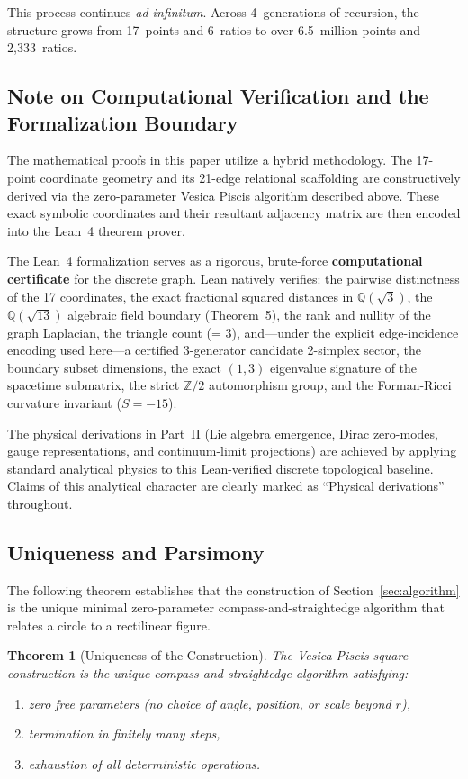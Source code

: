\documentclass[12pt, a4paper]{article}
\newtheorem{theorem}{Theorem}
\begin{document}
\noindent This process continues \emph{ad infinitum}. Across 4~generations of recursion, the structure grows from 17~points and 6~ratios to over 6.5~million points and 2{,}333~ratios.

\subsection{Note on Computational Verification and the Formalization Boundary}\label{sec:formalization}

The mathematical proofs in this paper utilize a hybrid methodology. The 17-point coordinate geometry and its 21-edge relational scaffolding are constructively derived via the zero-parameter Vesica Piscis algorithm described above. These exact symbolic coordinates and their resultant adjacency matrix are then encoded into the Lean~4 theorem prover.

The Lean~4 formalization serves as a rigorous, brute-force \textbf{computational certificate} for the discrete graph. Lean natively verifies: the pairwise distinctness of the 17 coordinates, the exact fractional squared distances in $\mathbb{Q}(\sqrt{3})$, the $\mathbb{Q}(\sqrt{13})$ algebraic field boundary (Theorem~5), the rank and nullity of the graph Laplacian, the triangle count (= 3), and---under the explicit edge-incidence encoding used here---a certified 3-generator candidate 2-simplex sector, the boundary subset dimensions, the exact $(1,3)$ eigenvalue signature of the spacetime submatrix, the strict $\mathbb{Z}/2$ automorphism group, and the Forman-Ricci curvature invariant ($S = -15$).

The physical derivations in Part~II (Lie algebra emergence, Dirac zero-modes, gauge representations, and continuum-limit projections) are achieved by applying standard analytical physics to this Lean-verified discrete topological baseline. Claims of this analytical character are clearly marked as ``Physical derivations'' throughout.

\subsection{Uniqueness and Parsimony}\label{sec:uniqueness}

The following theorem establishes that the construction of Section~\ref{sec:algorithm} is the unique minimal zero-parameter compass-and-straightedge algorithm that relates a circle to a rectilinear figure.

\begin{theorem}[Uniqueness of the Construction]
The Vesica Piscis square construction is the unique compass-and-straightedge algorithm satisfying:
\begin{enumerate}[nosep]
    \item[(i)] zero free parameters (no choice of angle, position, or scale beyond $r$),
    \item[(ii)] termination in finitely many steps,
    \item[(iii)] exhaustion of all deterministic operations.
\end{enumerate}
\end{theorem}
\end{document}
